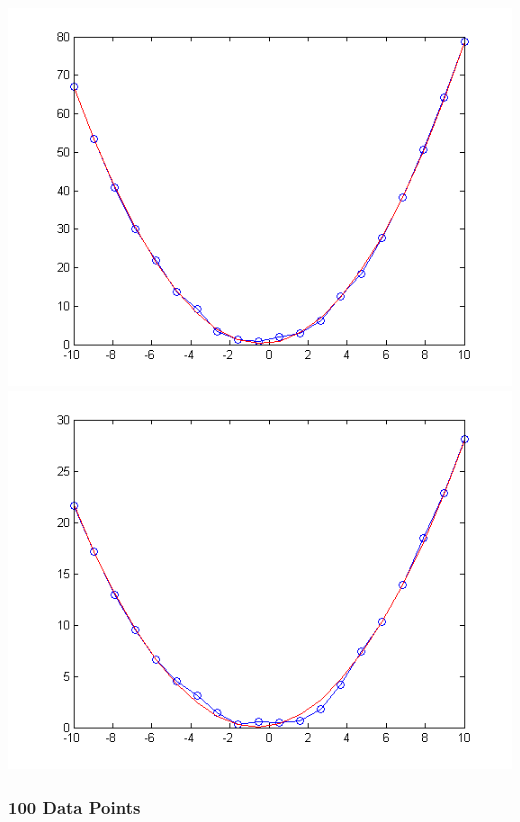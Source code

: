 \documentclass[12pt]{article}
\begin{document}
\includegraphics[scale=.5]{plot1.png}
\includegraphics[scale=.5]{plot2.png}

\subsubsection*{100 Data Points}
\end{document}
